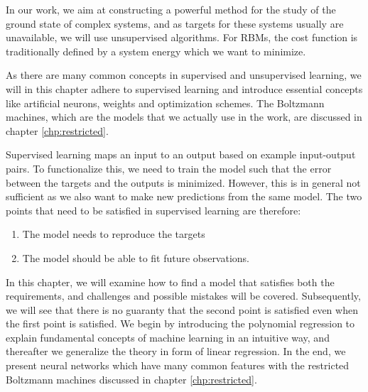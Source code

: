 In our work, we aim at constructing a powerful method for the study of the ground state of complex systems, and as targets for these systems usually are unavailable, we will use unsupervised algorithms. For RBMs, the cost function is traditionally defined by a system energy which we want to minimize. 

As there are many common concepts in supervised and unsupervised learning, we will in this chapter adhere to supervised learning and introduce essential concepts like artificial neurons, weights and optimization schemes. The Boltzmann machines, which are the models that we actually use in the work, are discussed in chapter \ref{chp:restricted}.

Supervised learning maps an input to an output based on example input-output pairs. To functionalize this, we need to train the model such that the error between the targets and the outputs is minimized. However, this is in general not sufficient as we also want to make new predictions from the same model. The two points that need to be satisfied in supervised learning are therefore:
\begin{enumerate}
	\item The model needs to reproduce the targets
	\item The model should be able to fit future observations.
\end{enumerate}
In this chapter, we will examine how to find a model that satisfies both the requirements, and challenges and possible mistakes will be covered. Subsequently, we will see that there is no guaranty that the second point is satisfied even when the first point is satisfied. We begin by introducing the polynomial regression to explain fundamental concepts of machine learning in an intuitive way, and thereafter we generalize the theory in form of linear regression. In the end, we present neural networks which have many common features with the restricted Boltzmann machines discussed in chapter \ref{chp:restricted}. 

